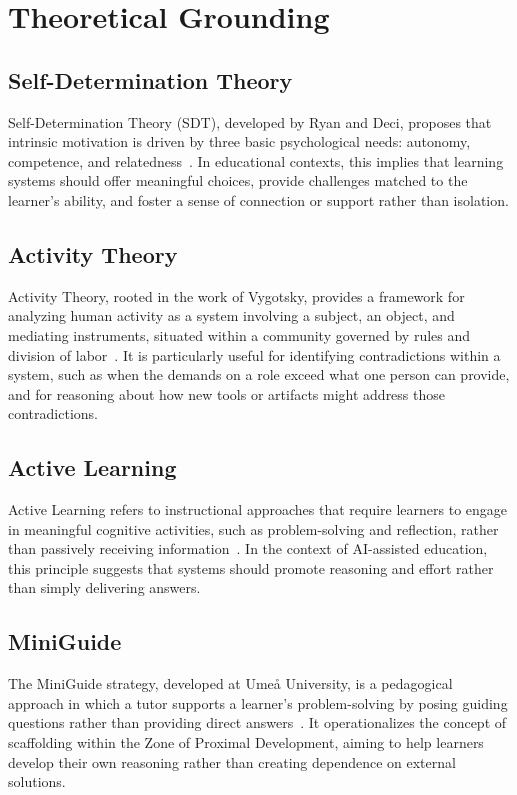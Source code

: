 \section{Theoretical Grounding}

\subsection{Self-Determination Theory}
Self-Determination Theory (SDT), developed by Ryan and Deci, proposes that intrinsic motivation is driven by three basic psychological needs: autonomy, competence, and relatedness~\cite{ryan2000self}. In educational contexts, this implies that learning systems should offer meaningful choices, provide challenges matched to the learner's ability, and foster a sense of connection or support rather than isolation.

\subsection{Activity Theory}
Activity Theory, rooted in the work of Vygotsky, provides a framework for analyzing human activity as a system involving a subject, an object, and mediating instruments, situated within a community governed by rules and division of labor~\cite{vygotsky1978mind}. It is particularly useful for identifying contradictions within a system, such as when the demands on a role exceed what one person can provide, and for reasoning about how new tools or artifacts might address those contradictions.

\subsection{Active Learning}
Active Learning refers to instructional approaches that require learners to engage in meaningful cognitive activities, such as problem-solving and reflection, rather than passively receiving information~\cite{nirenburg2017cognitive, ricci2022go}. In the context of AI-assisted education, this principle suggests that systems should promote reasoning and effort rather than simply delivering answers.

\subsection{MiniGuide}
The MiniGuide strategy, developed at Umeå University, is a pedagogical approach in which a tutor supports a learner's problem-solving by posing guiding questions rather than providing direct answers~\cite{lithner2025miniguide}. It operationalizes the concept of scaffolding within the Zone of Proximal Development, aiming to help learners develop their own reasoning rather than creating dependence on external solutions.